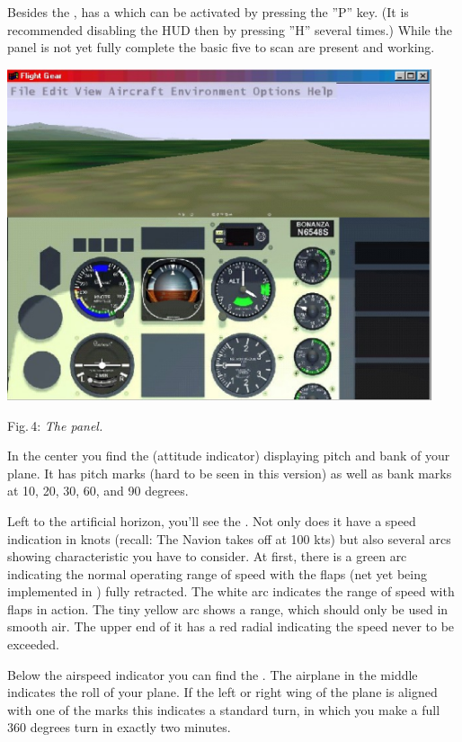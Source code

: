 Besides the , \FlightGear has a  which can be activated by
pressing the ''P'' key. (It is recommended disabling the HUD then by pressing ''H''
several times.) While the panel is not yet fully complete the basic five  to scan are present and working.
\medskip

 \centerline{
\includegraphics[clip,width=12.5cm]{panel.eps}
}

\smallskip
 \noindent
Fig.\,4: \textit{The panel.}
\medskip

In the center you find the  (attitude indicator) displaying
pitch and bank of your plane. It has pitch marks (hard to be seen in this version) as
well as bank marks at 10, 20, 30, 60, and 90 degrees.

Left to the artificial horizon, you'll see the . Not only does
it have a speed indication in knots (recall: The Navion takes off at 100 kts) but also
several arcs showing characteristic  you have to consider. At
first, there is a green arc indicating the normal operating range of speed with the flaps
(net yet being implemented in \FlightGear) fully retracted. The white arc indicates the
range of speed with flaps in action. The tiny yellow arc shows a range, which should only
be used in smooth air. The upper end of it has a red radial indicating the speed never to
be exceeded.

Below the airspeed indicator you can find the . The airplane in the
middle indicates the roll of your plane. If the left or right wing of the plane is
aligned with one of the marks this indicates a standard turn, in which you make a full
360 degrees turn in exactly two minutes.

